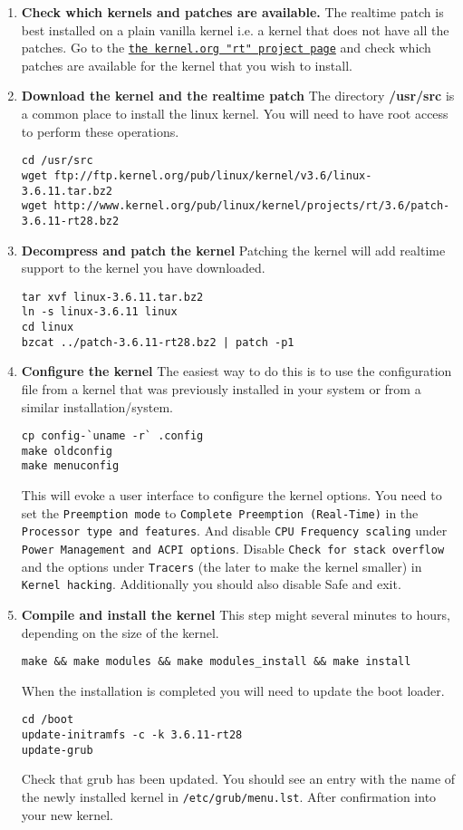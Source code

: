 \begin{enumerate}
	\item \textbf{Check which kernels and patches are available.} The realtime patch is best installed on a plain vanilla kernel i.e. a kernel that does not have all the patches.
Go to the \texttt{\href{http://www.kernel.org/pub/linux/kernel/projects/rt/}{the kernel.org "rt" project page}} and check which patches are available for the kernel that you wish to install. 

	\item \textbf{Download the kernel and the realtime patch} The directory \textbf{/usr/src} is a common place to install the linux kernel. You will need to have root access to perform these operations.
\begin{lstlisting}
cd /usr/src
wget ftp://ftp.kernel.org/pub/linux/kernel/v3.6/linux-3.6.11.tar.bz2 
wget http://www.kernel.org/pub/linux/kernel/projects/rt/3.6/patch-3.6.11-rt28.bz2
\end{lstlisting}

	\item \textbf{Decompress and patch the kernel} Patching the kernel will add realtime support to the kernel you have downloaded.
\begin{lstlisting}
tar xvf linux-3.6.11.tar.bz2
ln -s linux-3.6.11 linux
cd linux
bzcat ../patch-3.6.11-rt28.bz2 | patch -p1
\end{lstlisting}

	\item \textbf{Configure the kernel} The easiest way to do this is to use the configuration file from a kernel that was previously installed in your system or from a similar installation/system.
\begin{lstlisting}
cp config-`uname -r` .config
make oldconfig
make menuconfig
\end{lstlisting}

This will evoke a user interface to configure the kernel options.
You need to set the \texttt{Preemption mode} to \texttt{Complete Preemption (Real-Time)} in the \texttt{Processor type and features}. And disable \texttt{CPU Frequency scaling} under \texttt{Power Management and ACPI options}. Disable \texttt{Check for stack overflow} and the options under \texttt{Tracers} (the later to make the kernel smaller) in \texttt{Kernel hacking}. Additionally you should also disable 
Safe and exit.

	\item \textbf{Compile and install the kernel} This step might several minutes to hours, depending on the size of the kernel.
\begin{lstlisting}
make && make modules && make modules_install && make install
\end{lstlisting}
When the installation is completed you will need to update the boot loader.
\begin{lstlisting}
cd /boot
update-initramfs -c -k 3.6.11-rt28
update-grub
\end{lstlisting}
Check that grub has been updated. You should see an entry with the name of the newly installed kernel in \texttt{/etc/grub/menu.lst}. After confirmation  into your new kernel.
\end{enumerate}

